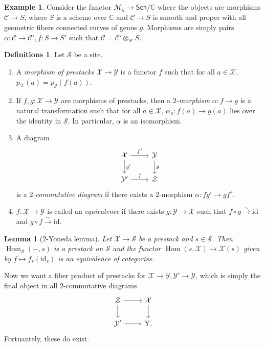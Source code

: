 \documentclass[leqno, openany]{memoir}
\newtheorem{lem}[thm]{Lemma}
\theoremstyle{definition}
\newtheorem{defns}[thm]{Definitions}
\newtheorem{exm}[thm]{Example}
\theoremstyle{remark}
\theoremstyle{plain}
\theoremstyle{definition}
\theoremstyle{remark}
\newcommand{\C}{\mathbb{C}}
\newcommand{\mc}[1]{\mathcal{#1}}
\newcommand{\mr}[1]{\mathrm{#1}}
\newcommand{\ms}[1]{\mathsf{#1}}
\DeclareMathOperator{\Hom}{Hom}
\begin{document}
\begin{exm}
    Consider the functor $\mc{M}_g \to \ms{Sch}/\C$ where the objects are morphisms $\mc{C} \to S$, where $S$ is a scheme over $\C$ and $\mc{C} \to S$ is smooth and proper with all geometric fibers connected curves of genus $g$. Morphisms are simply pairs $\alpha \colon \mc{C} \to \mc{C}', f \colon S \to S'$ such that $\mc{C} = \mc{C}' \otimes_{S'} S$.
\end{exm}

\begin{defns}
    Let $\mc{S}$ be a site.
    \begin{enumerate}
        \item A \textit{morphism of prestacks} $\mc{X} \to \mc{Y}$ is a functor $f$ such that for all $a \in \mc{X}$, $p_{\mc{X}}(a) = p_{\mc{Y}}(f(a))$. 
        \item If $f, g \colon \mc{X} \to \mc{Y}$ are morphisms of prestacks, then a \textit{$2$-morphism} $\alpha \colon f \to g$ is a natural transformation such that for all $a \in \mc{X}$, $\alpha_a \colon f(a) \to g(a)$ lies over the identity in $\mc{S}$. In particular, $\alpha$ is an isomorphism.
        \item A diagram
            \begin{equation*}
            \begin{tikzcd}
                \mc{X} \ar{r}{f'} \ar{d}{g'} & \mc{Y} \ar{d}{g} \\
                \mc{Y}' \ar{r}{f} & \mc{Z}
            \end{tikzcd}
            \end{equation*}
            is a \textit{$2$-commutative diagram} if there exists a $2$-morphism $\alpha \colon fg' \to gf'$.
        \item $f \colon \mc{X} \to \mc{Y}$ is called an \textit{equivalence} if there exists $g \colon \mc{Y} \to \mc{X}$ such that $f \circ g \xrightarrow{\sim} \mr{id}$ and $g \circ f \xrightarrow{\sim} \mr{id}$.
    \end{enumerate}
\end{defns}

\begin{lem}[2-Yoneda lemma]
    Let $\mc{X} \to \mc{S}$ be a prestack and $s \in \mc{S}$. Then $\Hom_{\mc{S}}(-, s)$ is a prestack on $\mc{S}$ and the functor $\Hom(s, \mc{X}) \to \mc{X}(s)$ given by $f \mapsto f_s(\mr{id}_s)$ is an equivalence of categories.
\end{lem}

Now we want a fiber product of prestacks for $\mc{X} \to \mc{Y}, \mc{Y}' \to \mc{Y}$, which is simply the final object in all $2$-commutative diagrams
\begin{equation*}
\begin{tikzcd}
    \mc{Z} \ar{r} \ar{d} & \mc{X} \ar{d} \\
    \mc{Y}' \ar{r} & \mr{Y}.
\end{tikzcd}
\end{equation*}
Fortuantely, these do exist.
\end{document}

